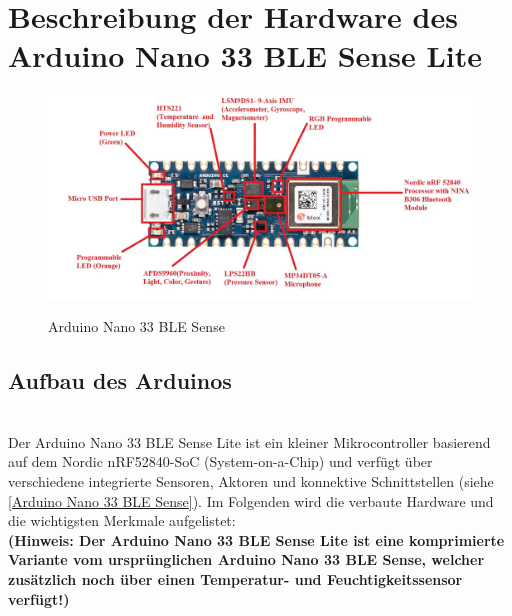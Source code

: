

\chapter{Beschreibung der Hardware des Arduino Nano 33 BLE Sense Lite}
\begin{figure}[htb]
	\begin{center}
		
		\includegraphics[width=\textwidth]{General/ArduinoBoard.png}
		\caption{Arduino Nano 33 BLE Sense}\cite{eTech.2021} \label{Arduino Nano 33 BLE Sense}
	\end{center}
\end{figure}
\section{Aufbau des Arduinos}
\cite{eTech.2021}\cite{ArdSense.2023}
\\
Der Arduino Nano 33 BLE Sense Lite ist ein kleiner Mikrocontroller basierend auf dem Nordic nRF52840-SoC (System-on-a-Chip) und verfügt über verschiedene integrierte Sensoren, Aktoren und konnektive Schnittstellen (siehe \autoref{Arduino Nano 33 BLE Sense}). Im Folgenden wird die verbaute Hardware und die wichtigsten Merkmale aufgelistet:
\\ \textbf{(Hinweis: Der Arduino Nano 33 BLE Sense Lite ist eine komprimierte Variante vom ursprünglichen Arduino Nano 33 BLE Sense, welcher zusätzlich noch über einen Temperatur- und Feuchtigkeitssensor verfügt!)} 

